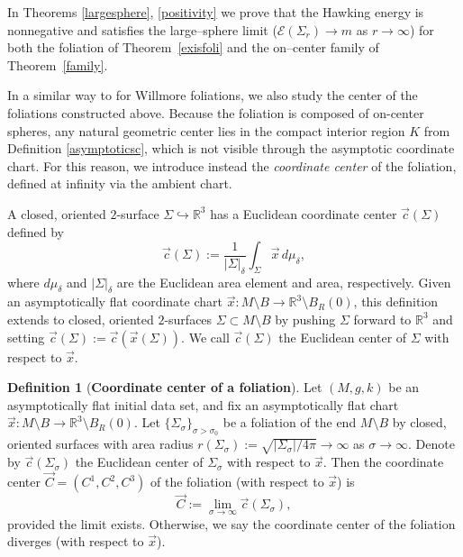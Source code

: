 \documentclass[12pt,a4paper]{amsart}
\theoremstyle{plain}
\theoremstyle{definition}
\newtheorem{definition}[theorem]{Definition}
\begin{document}
In Theorems \ref{largesphere}, \ref{positivity} we prove that the  Hawking energy is nonnegative and satisfies the large–sphere limit ($ \mathcal{E}(\Sigma_r)\to m $ as $r \to \infty$) for both the foliation of Theorem~\ref{exisfoli} and the on–center family of Theorem~\ref{family}.

 In a similar way to \cite{willcen} for Willmore foliations, we also study the center of the foliations constructed above. Because the foliation is composed of on-center spheres, any natural geometric center lies in the compact interior region \(K\) from Definition \ref{asymptoticsc}, which is not visible through the asymptotic coordinate chart. For this reason, we introduce instead the \emph{coordinate center} of the foliation, defined at infinity via the ambient chart.

A closed, oriented \(2\)-surface \(\Sigma \hookrightarrow \mathbb{R}^3\) has a Euclidean coordinate center \(\vec{c}(\Sigma)\) defined by
\begin{equation}
    \vec{c}(\Sigma) := \frac{1}{|\Sigma|_\delta} \int_{\Sigma} \vec{x} \, d\mu_\delta, \label{eq:euclidean_center}
\end{equation}
where \(d\mu_\delta\) and \(|\Sigma|_\delta\) are the Euclidean area element and area, respectively. Given an asymptotically flat coordinate chart \(\vec{x}: M \setminus B \to \mathbb{R}^3 \setminus B_R(0)\), this definition extends to closed, oriented \(2\)-surfaces \(\Sigma \subset M \setminus B\) by pushing \(\Sigma\) forward to \(\mathbb{R}^3\) and setting \(\vec{c}(\Sigma):=\vec{c}(\vec{x}(\Sigma))\). We call \(\vec{c}(\Sigma)\) the Euclidean center of \(\Sigma\) with respect to \(\vec{x}\).
\begin{definition}[\textbf{Coordinate center of a foliation}]
    Let \((M, g, k)\) be an asymptotically flat initial data set, and fix an asymptotically flat chart \(\vec{x}: M \setminus B \to \mathbb{R}^3 \setminus B_R(0)\). Let \(\{\Sigma_\sigma\}_{\sigma>\sigma_0}\) be a foliation of the end \(M \setminus B\) by closed, oriented surfaces with area radius \(r(\Sigma_\sigma):=\sqrt{|\Sigma_\sigma|/4\pi} \to \infty\) as \(\sigma \to \infty\). Denote by \(\vec{c}(\Sigma_\sigma)\) the Euclidean center of \(\Sigma_\sigma\) with respect to \(\vec{x}\). Then the coordinate center \(\vec{C}=(C^1,C^2,C^3)\) of the foliation (with respect to \(\vec{x}\)) is
    \[
        \vec{C} := \lim_{\sigma\to\infty} \vec{c}(\Sigma_\sigma),
    \]
    provided the limit exists. Otherwise, we say the coordinate center of the foliation diverges (with respect to \(\vec{x}\)).
\end{definition}
\end{document}

